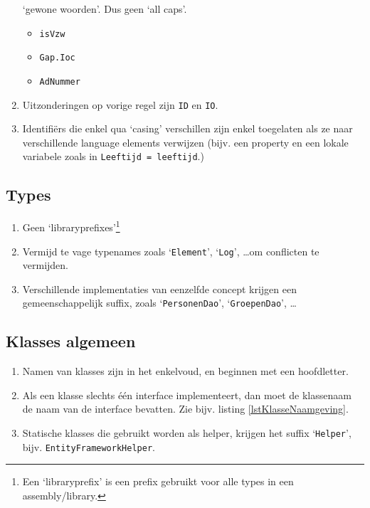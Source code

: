 \documentclass[a4paper,11pt]{article}
\begin{document}
\begin{enumerate}[resume]
`gewone woorden'.  Dus geen `all caps'.
\begin{itemize}
\item \lstinline !isVzw!
\item \lstinline !Gap.Ioc!
\item \lstinline !AdNummer!
\end{itemize}
\item Uitzonderingen op vorige regel zijn \lstinline !ID! en 
\lstinline !IO!.
\item Identifi\"ers die enkel qua `casing' verschillen zijn enkel
toegelaten als ze naar verschillende language elements verwijzen (bijv.
een property en een lokale variabele zoals in 
\lstinline !Leeftijd = leeftijd!.)
\end{enumerate}

\subsection{Types}

\begin{enumerate}[resume]
\item Geen `libraryprefixes'\footnote{Een `libraryprefix' is een prefix
gebruikt voor alle types in een assembly/library.}
\item Vermijd te vage typenames zoals `\lstinline !Element!',
`\lstinline !Log!', \ldots om conflicten te vermijden.
\item Verschillende implementaties van eenzelfde concept krijgen een
gemeenschappelijk suffix, zoals `\lstinline !PersonenDao!', `\lstinline !GroepenDao!', \ldots
\end{enumerate}

\subsection{Klasses algemeen}

\begin{enumerate}[resume]
\item Namen van klasses zijn in het enkelvoud, en beginnen met een hoofdletter.
\item Als een klasse slechts \'e\'en interface implementeert, dan moet de
klassenaam de naam van de interface bevatten.  Zie bijv. listing \ref{lstKlasseNaamgeving}.
\item Statische klasses die gebruikt worden als helper, krijgen het suffix
`\lstinline !Helper!', bijv. \lstinline !EntityFrameworkHelper!.
\end{enumerate}
\end{document}
